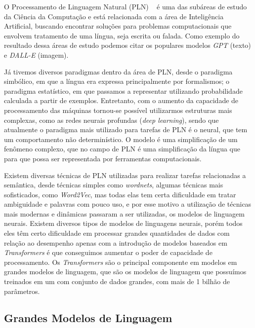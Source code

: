 O Processamento de Linguagem Natural (PLN) ~\cite{BPLN_livro:2024} é uma das subáreas de estudo da Ciência da Computação e está relacionada com a área de Inteligência Artificial, buscando encontrar soluções para problemas computacionais que envolvem tratamento de uma língua, seja escrita ou falada. Como exemplo do resultado dessa áreas de estudo podemos citar os populares modelos \textit{GPT} (texto) e \textit{DALL-E} (imagem).

Já tivemos diversos paradigmas dentro da área de PLN, desde o paradigma simbólico, em que a língua era expressa principalmente por formalismos; o paradigma estatístico, em que passamos a representar utilizando probabilidade calculada a partir de exemplos. Entretanto, com o aumento da capacidade de processamento das máquinas tornou-se possível utilizarmos estruturas mais complexas, como as redes neurais profundas (\textit{deep learning}), sendo que atualmente o paradigma mais utilizado para tarefas de PLN é o neural, que tem um comportamento não determinístico. O modelo é uma simplificação de um fenômeno complexo, que no campo de PLN é uma simplificação da língua que para que possa ser representada por ferramentas computacionais.

Existem diversas técnicas de PLN utilizadas para realizar tarefas relacionadas a semântica, desde técnicas simples como \textit{wordnets}, algumas técnicas mais sofisticados, como \textit{Word2Vec}, mas todas elas tem certa dificuldade em tratar ambiguidade e palavras com pouco uso, e por esse motivo a utilização de técnicas mais modernas e dinâmicas passaram a ser utilizadas, os modelos de linguagem neurais. Existem diversos tipos de modelos de linguagens neurais, porém todos eles têm certo dificuldade em processar grandes quantidades de dados com relação ao desempenho apenas com a introdução de modelos baseados em \textit{Transformers} é que conseguimos aumentar o poder de capacidade de processamento. Os \textit{Transformers} são o principal componente em modelos em grandes modelos de linguagem, que são os modelos de linguagem que possuímos treinados em um com conjunto de dados grandes, com mais de 1 bilhão de parâmetros.

\subsection{Grandes Modelos de Linguagem}
\label{cap:fund_teorica:sec:modelos}


